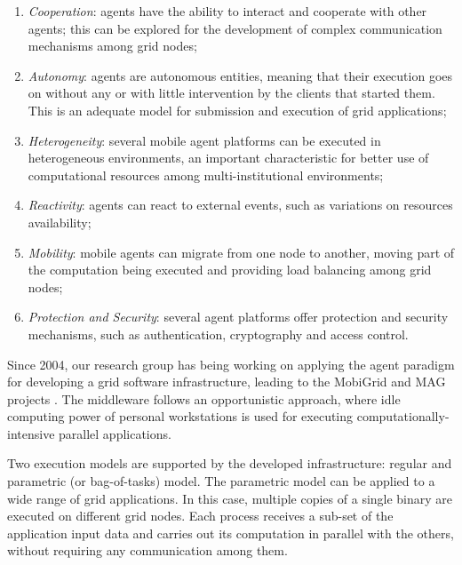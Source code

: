 \documentclass[times, 10pt, twocolumn]{article}
\begin{document}
\begin{enumerate}
    \item \emph{Cooperation}: agents have the ability to interact and cooperate
    with other agents; this can be explored for the development of complex
    communication mechanisms among grid nodes;
   
    \item \emph{Autonomy}: agents are autonomous entities, meaning that their
    execution goes on without any or with little intervention by the clients
    that started them. This is an adequate model for submission and execution
    of grid applications;
  
    \item \emph{Heterogeneity}: several mobile agent platforms can be executed
    in heterogeneous environments, an important characteristic for better use
    of computational resources among multi-institutional environments;
  
    \item \emph{Reactivity}: agents can react to external events, such as
    variations on resources availability;
  
    \item \emph{Mobility}: mobile agents can migrate from one node to another,
    moving part of the computation being executed and providing load balancing
    among grid nodes;
  
    \item \emph{Protection and Security}: several agent platforms offer
    protection and security mechanisms, such as authentication, cryptography
    and access control.
\end{enumerate}

Since 2004, our research group has being working on applying the agent paradigm
for developing a grid software infrastructure, leading to the MobiGrid and MAG
projects \cite{barbosa04,lopes05}. The middleware follows an opportunistic
approach, where idle computing power of personal workstations is used for
executing computationally-intensive parallel applications.

Two execution models are supported by the developed infrastructure: regular and
parametric (or bag-of-tasks) model. The parametric model can be applied to a
wide range of grid applications. In this case, multiple copies of a single
binary are executed on different grid nodes. Each process receives a sub-set of
the application input data and carries out its computation in parallel with the
others, without requiring any communication among them.
\end{document}
